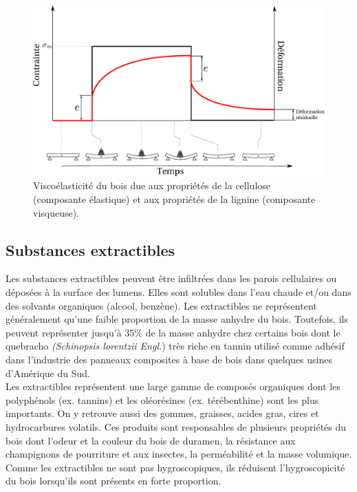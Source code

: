 \begin{figure}[h]
\centering
\includegraphics[scale=0.5]{img/ch6_contrainte}
\caption{Viscoélasticité du bois due aux propriétés de la cellulose (composante élastique) et aux propriétés de la lignine (composante visqueuse).}
\label{fig:contrainte}
\end{figure}

\subsection{Substances extractibles}

Les substances extractibles peuvent être infiltrées dans les parois cellulaires ou déposées à la surface des lumens. Elles sont solubles dans l'eau chaude et/ou dans des solvants organiques (alcool, benzène). Les extractibles ne représentent généralement qu'une faible proportion de la masse anhydre du bois. Toutefois, ils peuvent représenter jusqu'à 35\% de la masse anhydre chez certains bois dont le quebracho \textit{(Schinopsis lorentzii Engl.}) très riche en tannin utilisé comme adhésif dans l'industrie des panneaux composites à base de bois dans quelques usines d'Amérique du Sud.\\

Les extractibles représentent une large gamme de composés organiques dont les polyphénols (ex. tannins) et les oléorésines (ex. térébenthine) sont les plus importants. On y retrouve aussi des gommes, graisses, acides gras, cires et hydrocarbures volatils. Ces produits sont responsables de plusieurs propriétés du bois dont l'odeur et la couleur du bois de duramen, la résistance aux champignons de pourriture et aux insectes, la perméabilité et la masse volumique. Comme les extractibles ne sont pas hygroscopiques, ils réduisent l'hygroscopicité du bois lorsqu'ils sont présents en forte proportion.

